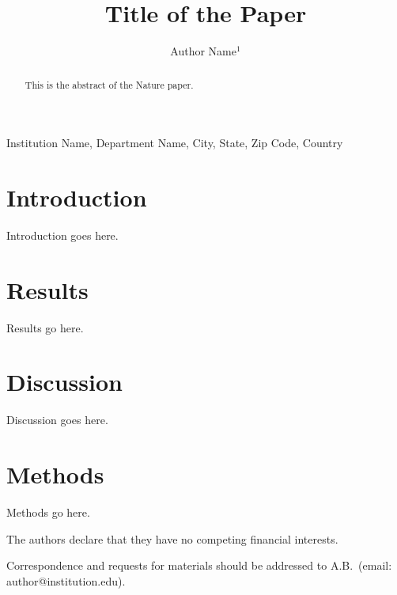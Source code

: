 \documentclass{nature}
\title{Title of the Paper}
\author{Author Name$^{1}$}
\begin{document}
\maketitle

\begin{affiliations}
 \item Institution Name, Department Name, City, State, Zip Code, Country
\end{affiliations}

\begin{abstract}
This is the abstract of the Nature paper.
\end{abstract}

\section{Introduction}
Introduction goes here.

\section{Results}
Results go here.

\section{Discussion}
Discussion goes here.

\section{Methods}
Methods go here.

\begin{addendum}
 \item[Competing Interests] The authors declare that they have no competing financial interests.
 \item[Correspondence] Correspondence and requests for materials should be addressed to A.B.~(email: author@institution.edu).
\end{addendum}
\end{document}
